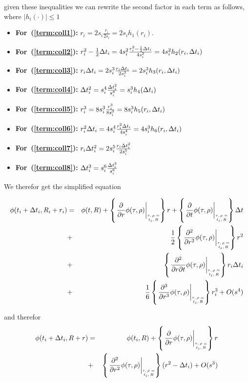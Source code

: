 \documentclass{article}[12pt]
\begin{document}
  given these inequalities we can rewrite the second factor in each
  term as follows, where $|h_i(\cdot)|\leq 1$
  \begin{itemize}
  \item {\bf For~(\ref{term:coll1}):}
    $r_i=2s_i\frac{r_i}{2s_i}=2s_ih_1(r_i)$.
  \item {\bf For~(\ref{term:coll2}):}
    $r_i^2 - \frac{1}{2}\Delta t_i = 4s_i^2\frac{r_i^2 -
      \frac{1}{2}\Delta t_i}{4s_i^2} = 4s_i^2 h_2(r_i,\Delta t_i)$
  \item {\bf For~(\ref{term:coll3}):} $r_i \Delta t_i = 2s_i^3
    \frac{r_i \Delta t_i}{2s_i^3} = 2s_i^3 h_3(r_i,\Delta t_i)$
  \item {\bf For~(\ref{term:coll4}):} $\Delta t_i^2 =
    s_i^4\frac{\Delta t_i^2}{s_i^4} = s_i^3 h_4(\Delta t_i)$
  \item {\bf For~(\ref{term:coll5}):} $r_i^3 = 8s_i^3
    \frac{r_i^3}{8s_i^3} = 8s_i^3 h_5(r_i,\Delta t_i)$
  \item {\bf For~(\ref{term:coll6}):} $r_i^2 \Delta t_i = 4s_i^4
    \frac{r_i^2 \Delta t_i}{4s_i^4} = 4s_i^3 h_6(r_i,\Delta t_i)$
  \item {\bf For~(\ref{term:coll7}):} $r_i \Delta t_i^2 = 2s_i^5
    \frac{r_i \Delta t_i^2}{2s_i^5}$
  \item {\bf For~(\ref{term:coll8}):} $\Delta t_i^3 = s_i^6 \frac{\Delta t_i^3}{s_i^6}$
\end{itemize}
  We therefor get the simplified equation
  
  \begin{eqnarray*} 
     \pot(t_i+\deltat_i,\R_i+r_i) & =&  \pot(t,\R)+\at{\frac{\partial}{\partial r}} r
    + \at{\frac{\partial}{\partial t}} \deltat \\
                                  &+& 
                                      \frac{1}{2}  \at{\frac{\partial^2}{\partial r^2}} r^2\\
                                  &+& \at{\frac{\partial^2}{\partial r \partial t}} r_i \deltat_i \label{term:Taylor_collected_rdt}\\
                                  &+& \frac{1}{6} \at{\frac{\partial^3}{\partial r^3}} r_i^3 \label{term:Taylor_collected_r3}
                                      + O(s^4)
\end{eqnarray*}

and therefor
  \begin{eqnarray} 
     \pot(t_i+\deltat_i,\R+r) &=& \pot(t_i,\R) +
                                  \at{\frac{\partial}{\partial r}} r
                                  \nonumber \\
    &+& \at{\frac{\partial^2}{\partial r^2}} (r^2 - \deltat_i) +
        O(s^3) \label{eqn:Taylor}
\end{eqnarray}
\end{document}
